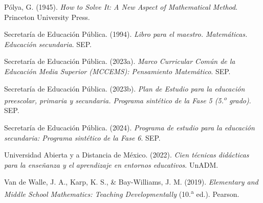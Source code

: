 \documentclass[spanish,letterpaper,oneside]{article}
\begin{document}
{\par\hangindent=1.27cm Pólya, G. (1945). \textit{How to Solve It: A New Aspect of Mathematical Method}. Princeton University Press.

\par\hangindent=1.27cm Secretaría de Educación Pública. (1994). \textit{Libro para el maestro. Matemáticas. Educación secundaria}. SEP.

\par\hangindent=1.27cm Secretaría de Educación Pública. (2023a). \textit{Marco Curricular Común de la Educación Media Superior (MCCEMS): Pensamiento Matemático}. SEP.

\par\hangindent=1.27cm Secretaría de Educación Pública. (2023b). \textit{Plan de Estudio para la educación preescolar, primaria y secundaria. Programa sintético de la Fase 5 (5.\textsuperscript{o} grado)}. SEP.

\par\hangindent=1.27cm Secretaría de Educación Pública. (2024). \textit{Programa de estudio para la educación secundaria: Programa sintético de la Fase 6}. SEP.

\par\hangindent=1.27cm Universidad Abierta y a Distancia de México. (2022). \textit{Cien técnicas didácticas para la enseñanza y el aprendizaje en entornos educativos}. UnADM.

\par\hangindent=1.27cm Van de Walle, J. A., Karp, K. S., \& Bay-Williams, J. M. (2019). \textit{Elementary and Middle School Mathematics: Teaching Developmentally} (10.\textsuperscript{a} ed.). Pearson.
}
\end{document}
